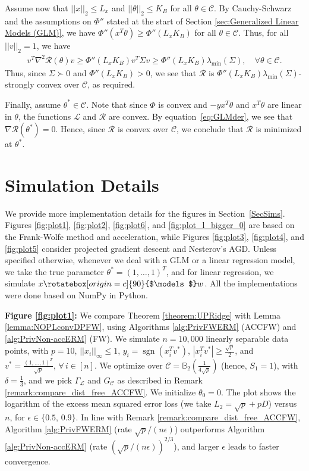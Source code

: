 \documentclass{article}
\newcommand{\indep}{\rotatebox[origin=c]{90}{$\models$}}
\begin{document}
Assume now that $||x||_2 \leq L_x$ and $||\theta||_2 \leq K_B$ for all $\theta \in \mathcal{C}$. By Cauchy-Schwarz and the assumptions on $\Phi''$ stated at the start of Section \ref{sec:Generalized Linear Models (GLM)}, we have $\Phi''(x^T\theta) \geq \Phi''(L_xK_B)$ for all $\theta \in \mathcal{C}$. Thus, for all $||v||_2 = 1$, we have
\begin{align*}
v^T\nabla^2\mathcal{R}(\theta)v \geq \Phi''(L_xK_B)v^T\Sigma v \geq \Phi''(L_xK_B)\lambda_{\min}(\Sigma), \quad \forall \theta \in \mathcal{C}.
\end{align*}
Thus, since $\Sigma \succ 0$ and $\Phi''(L_xK_B) > 0$, we see that $\mathcal{R}$ is $\Phi''(L_xK_B)\lambda_{\min}(\Sigma)$-strongly convex over $\mathcal{C}$, as required.

Finally, assume $\theta^* \in \mathcal{C}$. Note that since $\Phi$ is convex and $-yx^T\theta$ and $x^T\theta$ are linear in $\theta$, the functions $\mathcal{L}$ and $\mathcal{R}$ are convex. By equation~\eqref{eq:GLMder}, we see that $\nabla\mathcal{R}(\theta^*) = 0$. Hence, since $\mathcal{R}$ is convex over $\mathcal{C}$, we conclude that $\mathcal{R}$ is minimized at $\theta^*$.


\section{Simulation Details}
\label{AppSims}

We provide more implementation details for the figures in Section~\ref{SecSims}. Figures \ref{fig:plot1}, \ref{fig:plot2}, \ref{fig:plot6}, and \ref{fig:plot_l_bigger_0} are based on the Frank-Wolfe method and acceleration, while Figures \ref{fig:plot3}, \ref{fig:plot4}, and \ref{fig:plot5} consider projected gradient descent and Nesterov's AGD. Unless specified otherwise, whenever we deal with a GLM or a linear regression model, we take the true parameter $\theta^* = (1, \dots, 1)^T$, and for linear regression, we simulate $x \indep w$. All the implementations were done based on NumPy in Python.

\textbf{Figure \ref{fig:plot1}:} We compare Theorem \ref{theorem:UPRidge} with Lemma \ref{lemma:NOPLconvDPFW}, using Algorithms \ref{alg:PrivFWERM} (ACCFW) and \ref{alg:PrivNon-accERM} (FW). We simulate $n = 10,000$ linearly separable data points, with $p = 10$, $||x_i||_\infty\leq 1$, $y_i = \operatorname{sgn}(x_i^T v^*)$, $|x_i^Tv^*|\geq \frac{\sqrt{p}}{2}$, and $v^*=\frac{(1,\dots,1)^T}{\sqrt{p}}$, $\forall\, i\in[n]$. We optimize over $\mathcal{C} = \mathbb{B}_2\left(\frac{1}{4\sqrt{p}}\right)$ (hence, $S_1 = 1$), with $\delta = \frac{1}{3}$, and we pick $\Gamma_{\mathcal{L}}$ and $G_{\mathcal{C}}$ as described in Remark \ref{remark:compare_dist_free_ACCFW}. We initialize $\theta_0 = 0$. The plot shows the logarithm of the excess mean squared error loss (we take $L_2 = \sqrt{p} + pD$) versus $n$, for $\epsilon\in\{0.5,\,0.9\}$. In line with Remark \ref{remark:compare_dist_free_ACCFW}, Algorithm \ref{alg:PrivFWERM} (rate $\sqrt{p}/(n\epsilon)$) outperforms Algorithm \ref{alg:PrivNon-accERM} (rate $(\sqrt{p}/(n\epsilon))^{2/3}$), and larger $\epsilon$ leads to faster convergence.
\end{document}
